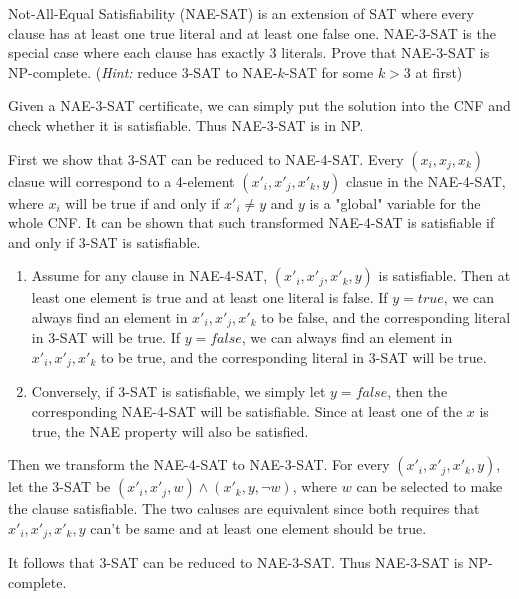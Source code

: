 \begin{exercise}[]{Not-All-Equal Satisfiability (NAE-SAT) is an extension of SAT where every clause has at least one true literal and at least one false one. NAE-$3$-SAT is the special case where each clause has exactly $3$ literals. Prove that NAE-$3$-SAT is NP-complete. (\textit{Hint:} reduce $3$-SAT to NAE-$k$-SAT for some $k > 3$ at first)}
  \begin{solution} Given a NAE-3-SAT certificate, we can simply put the solution into the CNF and check whether it is satisfiable. Thus NAE-3-SAT is in NP.

  First we show that 3-SAT can be reduced to NAE-4-SAT. Every $(x_i,x_j,x_k)$ clasue will correspond to a 4-element $(x'_i,x'_j,x'_k,y)$ clasue in the NAE-4-SAT, where $x_i$ will be true if and only if $x'_i \neq y$ and $y$ is a "global" variable for the whole CNF. It can be shown that such transformed NAE-4-SAT is satisfiable if and only if 3-SAT is satisfiable.
  \begin{enumerate}
    \item Assume for any clause in NAE-4-SAT, $(x'_i,x'_j,x'_k,y)$ is satisfiable. Then at least one element is true and at least one literal is false. If $y = true$, we can always find an element in $x'_i,x'_j,x'_k$ to be false, and the corresponding literal in 3-SAT will be true. If $y = false$, we can always find an element in $x'_i,x'_j,x'_k$ to be true, and the corresponding literal in 3-SAT will be true.
    \item Conversely, if 3-SAT is satisfiable, we simply let $y=false$, then the corresponding NAE-4-SAT will be satisfiable. Since at least one of the $x$ is true, the NAE property will also be satisfied.
  \end{enumerate}

  Then we transform the NAE-4-SAT to NAE-3-SAT. For every $(x'_i,x'_j,x'_k,y)$, let the 3-SAT be $(x'_i,x'_j,w) \wedge (x'_k,y,\neg w)$, where $w$ can be selected to make the clause satisfiable. The two caluses are equivalent since both requires that $x'_i,x'_j,x'_k,y$ can't be same and at least one element should be true.

  It follows that 3-SAT can be reduced to NAE-3-SAT. Thus NAE-3-SAT is NP-complete.


  \end{solution}
  \label{ex4}
\end{exercise}




